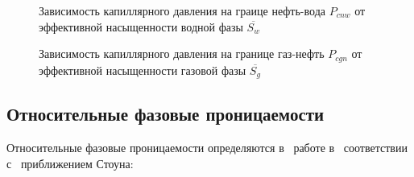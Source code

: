 \begin{figure}[h]
\begin{minipage}[h]{0.49\linewidth}
\caption{Зависимость капиллярного давления на граице нефть-вода
$P_{cnw}$ от эффективной насыщенности водной фазы $\overline{S_w}$}
\label{tikz_P_cnw}
\end{minipage}
\hfill
\begin{minipage}[h]{0.49\linewidth}
\caption{Зависимость капиллярного давления на границе газ-нефть 
$P_{cgn}$ от эффективной насыщенности газовой фазы $\overline{S_g}$}
\label{tikz_P_cgn}
\end{minipage}
\end{figure}

\subsection{Относительные фазовые проницаемости}
Относительные фазовые проницаемости определяются в~ работе в~ соответствии с~
приближением Стоуна\cite{Aziz-Settari}:

